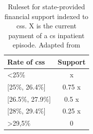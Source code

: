 \begin{table}[htbp]
  \centering
  \caption[Ruleset for financial support indexed to \acsp{cs}.]{Ruleset for state-provided financial support indexed to \acp{cs}. X is the current payment of a \ac{cs} inpatient episode. Adapted from \cite{acssTermosReferenciaPara2023}}
  \label{tab:corrections}
  \renewcommand{\arraystretch}{1.2} %
  \setlength{\tabcolsep}{12pt} %
  \begin{tabular}{lc}
      \hline
Rate of \acp{cs}   & Support \\
    \hline
\textless 25\%       & x       \\
{[}25\%, 26.4\%{]}   & 0.75 x   \\
{[}26.5\%, 27.9\%{]} & 0.5 x    \\
{[}28\%, 29.4\%{]}   & 0.25 x   \\
\textgreater{}29,5\% & 0      \\
    \hline
\end{tabular}
\end{table}